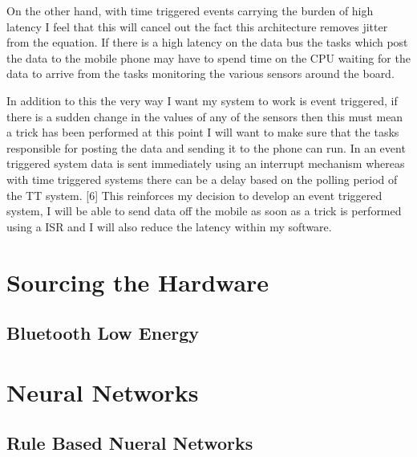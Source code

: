 On the other hand, with time triggered events carrying the burden of high latency I feel that this will cancel out the fact this architecture removes jitter from the equation. If there is a high latency on the data bus the tasks which post the data to the mobile phone may have to spend time on the CPU waiting for the data to arrive from the tasks monitoring the various sensors around the board. 

In addition to this the very way I want my system to work is event triggered, if there is a sudden change in the values of any of the sensors then this must mean a trick has been performed at this point I will want to make sure that the tasks responsible for posting the data and sending it to the phone can run. In an event triggered system data is sent immediately using an interrupt mechanism whereas with time triggered systems there can be a delay based on the polling period of the TT system. [6] This reinforces my decision to develop an event triggered system, I will be able to send data off the mobile as soon as a trick is performed using a ISR and I will also reduce the latency within my software.

\section{Sourcing the Hardware}\label{anaylsis:sourcinghardware}

\subsection{Bluetooth Low Energy}\label{anaylsis:bluetoothLE}

\section{Neural Networks}\label{anaylsis:neuralnetwork}

\subsection{Rule Based Nueral Networks}\label{anaylsis:ruledbasedNN}




